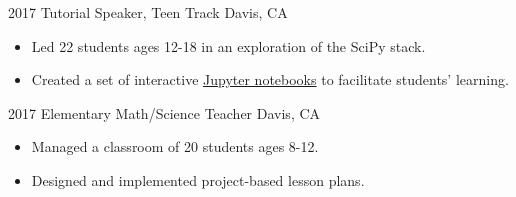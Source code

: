 \documentclass[]{cv-style}          %
\begin{document}
\begin{entrylist}

\entry
  {2017}
  {Tutorial Speaker, Teen Track}
  {Davis, CA}
  { 
  \begin{itemize}
    \item Led 22 students ages 12-18 in an exploration of the SciPy stack.
    \item Created a set of interactive \href{https://github.com/eqfinney/SciPy}{Jupyter notebooks} to facilitate students' learning.\\
  \end{itemize}}
\entry
  {2017}
  {Elementary Math/Science Teacher}
  {Davis, CA}
  { 
  \begin{itemize}
    \item Managed a classroom of 20 students ages 8-12.
    \item Designed and implemented project-based lesson plans.\\
  \end{itemize}}


\end{entrylist}
  
\end{document}
